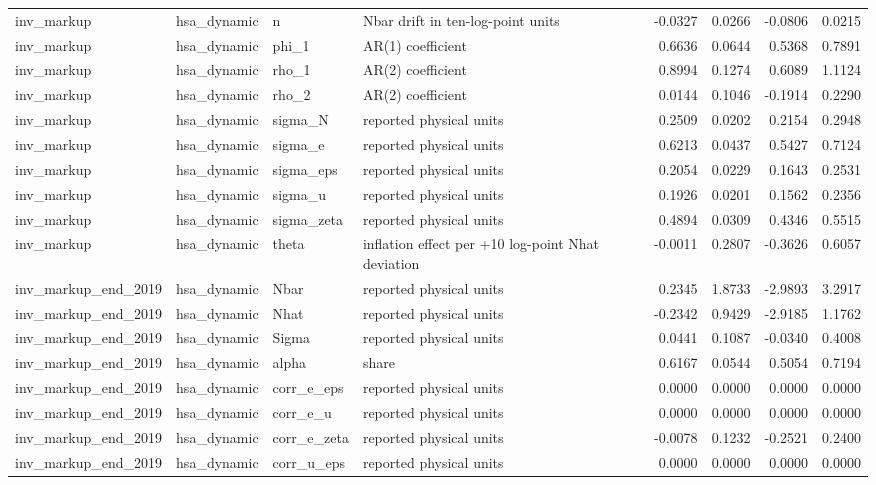 \begin{tabular}{llllrrrr}
inv\_markup & hsa\_dynamic & n & Nbar drift in ten-log-point units & -0.0327 & 0.0266 & -0.0806 & 0.0215 \\
inv\_markup & hsa\_dynamic & phi\_1 & AR(1) coefficient & 0.6636 & 0.0644 & 0.5368 & 0.7891 \\
inv\_markup & hsa\_dynamic & rho\_1 & AR(2) coefficient & 0.8994 & 0.1274 & 0.6089 & 1.1124 \\
inv\_markup & hsa\_dynamic & rho\_2 & AR(2) coefficient & 0.0144 & 0.1046 & -0.1914 & 0.2290 \\
inv\_markup & hsa\_dynamic & sigma\_N & reported physical units & 0.2509 & 0.0202 & 0.2154 & 0.2948 \\
inv\_markup & hsa\_dynamic & sigma\_e & reported physical units & 0.6213 & 0.0437 & 0.5427 & 0.7124 \\
inv\_markup & hsa\_dynamic & sigma\_eps & reported physical units & 0.2054 & 0.0229 & 0.1643 & 0.2531 \\
inv\_markup & hsa\_dynamic & sigma\_u & reported physical units & 0.1926 & 0.0201 & 0.1562 & 0.2356 \\
inv\_markup & hsa\_dynamic & sigma\_zeta & reported physical units & 0.4894 & 0.0309 & 0.4346 & 0.5515 \\
inv\_markup & hsa\_dynamic & theta & inflation effect per +10 log-point Nhat deviation & -0.0011 & 0.2807 & -0.3626 & 0.6057 \\
inv\_markup\_end\_2019 & hsa\_dynamic & Nbar & reported physical units & 0.2345 & 1.8733 & -2.9893 & 3.2917 \\
inv\_markup\_end\_2019 & hsa\_dynamic & Nhat & reported physical units & -0.2342 & 0.9429 & -2.9185 & 1.1762 \\
inv\_markup\_end\_2019 & hsa\_dynamic & Sigma & reported physical units & 0.0441 & 0.1087 & -0.0340 & 0.4008 \\
inv\_markup\_end\_2019 & hsa\_dynamic & alpha & share & 0.6167 & 0.0544 & 0.5054 & 0.7194 \\
inv\_markup\_end\_2019 & hsa\_dynamic & corr\_e\_eps & reported physical units & 0.0000 & 0.0000 & 0.0000 & 0.0000 \\
inv\_markup\_end\_2019 & hsa\_dynamic & corr\_e\_u & reported physical units & 0.0000 & 0.0000 & 0.0000 & 0.0000 \\
inv\_markup\_end\_2019 & hsa\_dynamic & corr\_e\_zeta & reported physical units & -0.0078 & 0.1232 & -0.2521 & 0.2400 \\
inv\_markup\_end\_2019 & hsa\_dynamic & corr\_u\_eps & reported physical units & 0.0000 & 0.0000 & 0.0000 & 0.0000 \\

\end{tabular}
